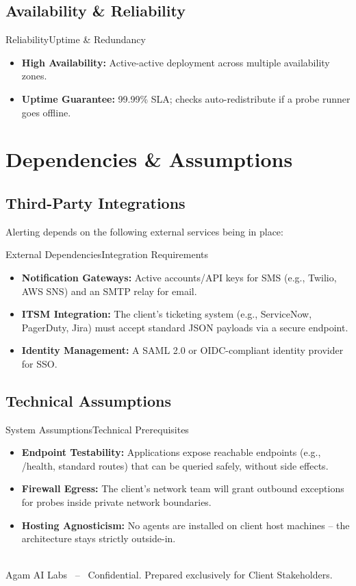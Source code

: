 \documentclass[11pt,a4paper]{article}
\begin{document}
\subsection{Availability \& Reliability}
\begin{issuebox}{Reliability}{Uptime \& Redundancy}
\begin{itemize}
  \item \textbf{High Availability:} Active-active deployment across multiple availability zones.
  \item \textbf{Uptime Guarantee:} 99.99\% SLA; checks auto-redistribute if a probe runner goes offline.
\end{itemize}
\end{issuebox}

\section{Dependencies \& Assumptions}

\subsection{Third-Party Integrations}
Alerting depends on the following external services being in place:

\begin{issuebox}{External Dependencies}{Integration Requirements}
\begin{itemize}
  \item \textbf{Notification Gateways:} Active accounts/API keys for SMS (e.g., Twilio, AWS SNS) and an SMTP relay for email.
  \item \textbf{ITSM Integration:} The client's ticketing system (e.g., ServiceNow, PagerDuty, Jira) must accept standard JSON payloads via a secure endpoint.
  \item \textbf{Identity Management:} A SAML 2.0 or OIDC-compliant identity provider for SSO.
\end{itemize}
\end{issuebox}

\subsection{Technical Assumptions}
\begin{issuebox}{System Assumptions}{Technical Prerequisites}
\begin{itemize}
  \item \textbf{Endpoint Testability:} Applications expose reachable endpoints (e.g., /health, standard routes) that can be queried safely, without side effects.
  \item \textbf{Firewall Egress:} The client's network team will grant outbound exceptions for probes inside private network boundaries.
  \item \textbf{Hosting Agnosticism:} No agents are installed on client host machines -- the architecture stays strictly outside-in.
\end{itemize}
\end{issuebox}

\vfill
\noindent{\color{linegray}\rule{\linewidth}{0.6pt}}\\[6pt]
\fontsize{8.3}{10}\selectfont\textcolor{softgray}{Agam AI Labs \ -- \ Confidential. Prepared exclusively for Client Stakeholders.}
\end{document}
